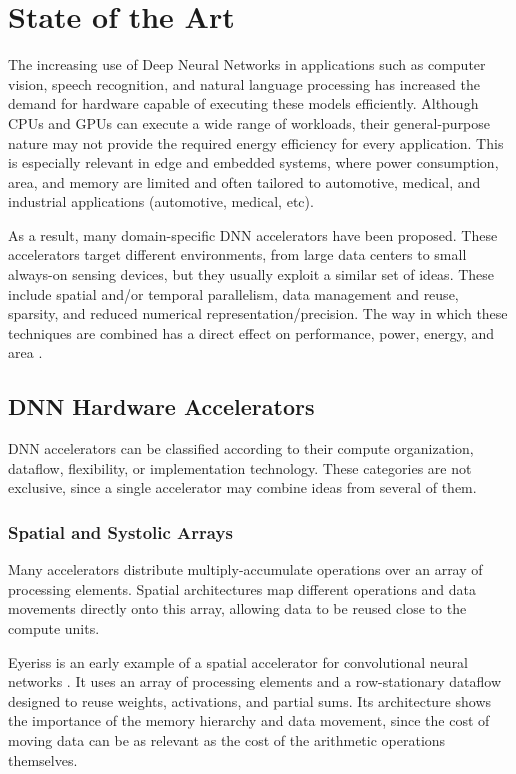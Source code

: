 \clearpage
\section{State of the Art}

The increasing use of Deep Neural Networks in applications such as
computer vision, speech recognition, and natural language processing
has increased the demand for hardware capable of executing these
models efficiently. Although CPUs and GPUs can execute a wide range of
workloads, their general-purpose nature may not provide the required
energy efficiency for every application. This is especially relevant
in edge and embedded systems, where power consumption, area, and
memory are limited and often tailored to automotive, medical, and
industrial applications (automotive, medical, etc).

As a result, many domain-specific DNN accelerators have been proposed.
These accelerators target different environments, from large data
centers to small always-on sensing devices, but they usually exploit a
similar set of ideas. These include spatial and/or temporal parallelism, data management and reuse,
sparsity, and reduced numerical representation/precision. The way in which these
techniques are combined has a direct effect on performance, power,
energy, and area \cite{sze2017efficient}.

\subsection{DNN Hardware Accelerators}

DNN accelerators can be classified according to their compute
organization, dataflow, flexibility, or implementation technology.
These categories are not exclusive, since a single accelerator may
combine ideas from several of them.

\subsubsection{Spatial and Systolic Arrays}

Many accelerators distribute multiply-accumulate operations over an
array of processing elements. Spatial architectures map different
operations and data movements directly onto this array, allowing data
to be reused close to the compute units.

Eyeriss is an early example of a spatial accelerator for convolutional
neural networks \cite{eyeriss}. It uses an array of processing elements
and a row-stationary dataflow designed to reuse weights, activations,
and partial sums. Its architecture shows the importance of the memory
hierarchy and data movement, since the cost of moving data can be as
relevant as the cost of the arithmetic operations themselves.


